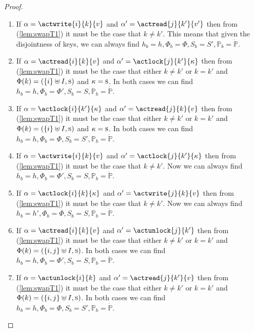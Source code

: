 \begin{lem}
\begin{proof}
\begin{enumerate}[label=({\roman*})]
		\item If $\alpha = \actwrite{i}{k}{v}$ and $\alpha' = \actread{j}{k'}{v'}$ then from (\ref{lem:swapT1}) it must be the case that $k \neq k'$. This means that given the disjointness of keys, we can always find $h_b = h, \Phi_b = \Phi, S_b = S', \mathds{P}_b = \dot{\mathds{P}}$.
		
		\item If $\alpha = \actread{i}{k}{v}$ and $\alpha' = \actlock{j}{k'}{\kappa}$ then from (\ref{lem:swapT1}) it must be the case that either $k \neq k'$ or $k = k'$ and $\Phi(k) = (\{i\} \uplus I, \textsc{s})$ and $\kappa = \textsc{s}$. In both cases we can find $h_b = h, \Phi_b = \Phi', S_b = S, \mathds{P}_b = \dot{\mathds{P}}$.
		
		\item If $\alpha = \actlock{i}{k'}{\kappa}$ and $\alpha' = \actread{j}{k}{v}$ then from (\ref{lem:swapT1}) it must be the case that either $k \neq k'$ or $k = k'$ and $\Phi(k) = (\{i\} \uplus I, \textsc{s})$ and $\kappa = \textsc{s}$. In both cases we can find $h_b = h, \Phi_b = \Phi, S_b = S', \mathds{P}_b = \dot{\mathds{P}}$.
		
		\item If $\alpha = \actwrite{i}{k}{v}$ and $\alpha' = \actlock{j}{k'}{\kappa}$ then from (\ref{lem:swapT1}) it must be the case that $k \neq k'$. Now we can always find $h_b = h, \Phi_b = \Phi', S_b = S, \mathds{P}_b = \dot{\mathds{P}}$.
		
		\item If $\alpha = \actlock{i}{k}{\kappa}$ and $\alpha' = \actwrite{j}{k}{v}$ then from (\ref{lem:swapT1}) it must be the case that $k \neq k'$. Now we can always find $h_b = h', \Phi_b = \Phi, S_b = S, \mathds{P}_b = \dot{\mathds{P}}$.
		
		\item If $\alpha = \actread{i}{k}{v}$ and $\alpha' = \actunlock{j}{k'}$ then from (\ref{lem:swapT1}) it must be the case that either $k \neq k'$ or $k = k'$ and $\Phi(k) = (\{i,j\} \uplus I, \textsc{s})$. In both cases we can find $h_b = h, \Phi_b = \Phi', S_b = S, \mathds{P}_b = \dot{\mathds{P}}$.
		
		\item If $\alpha =\actunlock{i}{k}$ and $\alpha' = \actread{j}{k'}{v}$ then from (\ref{lem:swapT1}) it must be the case that either $k \neq k'$ or $k = k'$ and $\Phi(k) = (\{i,j\} \uplus I, \textsc{s})$. In both cases we can find $h_b = h, \Phi_b = \Phi, S_b = S', \mathds{P}_b = \dot{\mathds{P}}$.
		

\end{enumerate}
\end{proof}
\end{lem}
